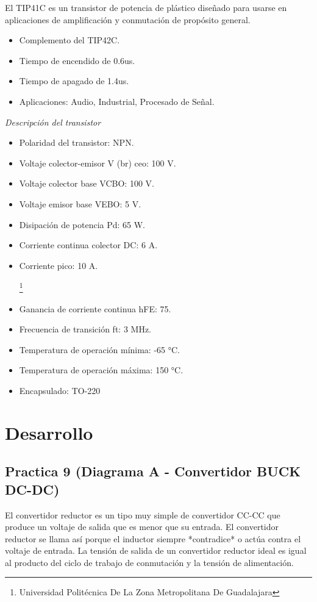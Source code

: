 \documentclass[11pt,a4paper]{article}
\begin{document}
El TIP41C es un transistor de potencia de plástico diseñado para usarse en aplicaciones de amplificación y conmutación de propósito general. 

\begin{itemize}
\item Complemento del TIP42C. 
\item Tiempo de encendido de 0.6us.
\item Tiempo de apagado de 1.4us.
\item Aplicaciones: Audio, Industrial, Procesado de Señal.
\end{itemize}

\textit{Descripción del transistor}

\begin{itemize}
\item Polaridad del transistor: NPN.
\item Voltaje colector-emisor  V (br) ceo: 100 V.
\item Voltaje colector base VCBO: 100 V.
\item Voltaje emisor base VEBO: 5 V.
\item Disipación de potencia Pd: 65 W.
\item Corriente continua colector DC: 6 A.
\item Corriente pico: 10 A.

\footnote{Universidad Politécnica De La Zona Metropolitana De Guadalajara} 

\newpage

\item Ganancia de corriente continua hFE: 75.
\item Frecuencia de transición ft: 3 MHz.
\item Temperatura de operación mínima: -65 °C.
\item Temperatura de operación máxima: 150 °C.
\item  Encapsulado: TO-220
\end{itemize}

\section{Desarrollo}

\subsection{Practica 9 (Diagrama A - Convertidor BUCK DC-DC)}

El convertidor reductor es un tipo muy simple de convertidor CC-CC que produce un voltaje de salida que es menor que su entrada. El convertidor reductor se llama así porque el inductor siempre *contradice* o actúa contra el voltaje de entrada. La tensión de salida de un convertidor reductor ideal es igual al producto del ciclo de trabajo de conmutación y la tensión de alimentación.
\end{document}
